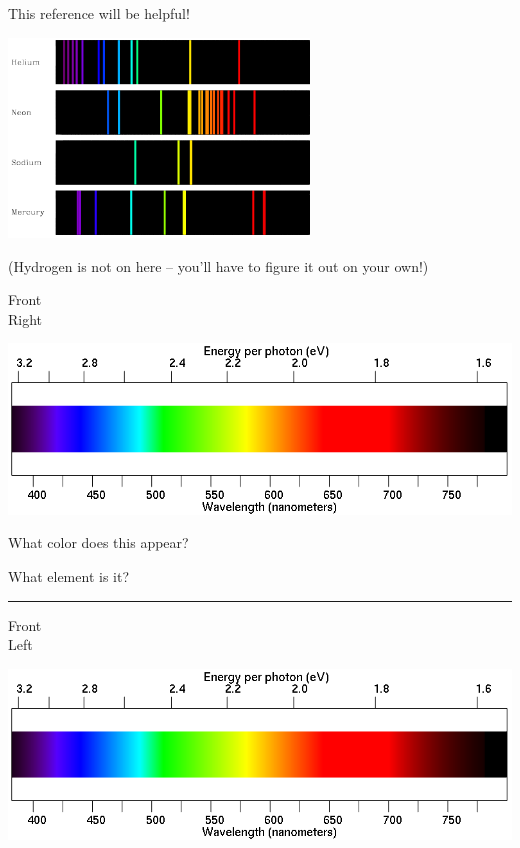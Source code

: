 \documentclass[12pt]{article}
\begin{document}
\bigskip
\begin{center}
\Large This reference will be helpful!

\includegraphics[width=0.6\textwidth]{spectra.png}

(Hydrogen is not on here -- you'll have to figure it out on your own!)
\end{center}
\newpage

\begin{minipage}{0.1\textwidth}
\begin{center}
\Large Front \\ Right
\end{center}
\end{minipage}
\begin{minipage}{0.8\textwidth}
\includegraphics[width=\textwidth]{spectrum2.png}
\end{minipage}

\begin{minipage}{0.5\textwidth}
What color does this appear?
\end{minipage}
\begin{minipage}{0.5\textwidth}
What element is it?
\end{minipage}


\vspace{1in}
\hrule

\begin{minipage}{0.1\textwidth}
\begin{center}
\Large Front \\ Left
\end{center}
\end{minipage}
\begin{minipage}{0.8\textwidth}
\includegraphics[width=\textwidth]{spectrum2.png}
\end{minipage}
\end{document}

